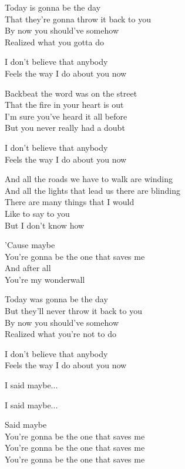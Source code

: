 
\ve
{}Today is gonna be the day\\
That they're gonna throw it back to you\\
By now you should've somehow\\
Realized what you gotta do

I don't believe that anybody\\
Feels the way I do about you now 

\ve{}
Backbeat the word was on the street\\
That the fire in your heart is out\\
I'm sure you've heard it all before\\
But you never really had a doubt

I don't believe that anybody\\
Feels the way I do about you now

\re{*:}
And all the roads we have to walk are winding\\
And all the lights that lead us there are blinding\\
There are many things that I would\\
Like to say to you\\
But I don't know how

\cho{}
'Cause maybe \\
You're gonna be the one that saves me \\
And after all \\
You're my wonderwall 

\ve{}
Today was gonna be the day\\
But they'll never throw it back to you\\
By now you should've somehow\\
Realized what you're not to do

I don't believe that anybody\\
Feels the way I do about you now

\re{*:}

\cho{}
I said maybe...

\cho{}
I said maybe...

Said maybe\\
You're gonna be the one that saves me\\
You're gonna be the one that saves me\\
You're gonna be the one that saves me


\esong